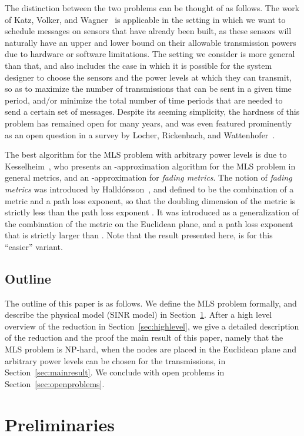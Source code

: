 \documentclass{article}
\begin{document}
The distinction between the two problems can be thought of as follows. The work of Katz, Volker, and Wagner~\cite{KVW10}
is applicable in the setting in which we want to schedule messages on sensors that have already been built, as these sensors will naturally have an upper and lower bound on their allowable transmission powers due to hardware or software limitations.
The setting we consider is more general than that, and also includes the case in which
it is possible for the system designer to choose the sensors and the power levels at which they can transmit, so as to maximize the number of transmissions that can be sent in a given time period, and/or minimize the total number of time periods that are needed to send a certain set of messages.  Despite its seeming simplicity, the hardness of this problem has remained open for many years, and was even featured prominently as an open question in a survey by Locher, Rickenbach, and Wattenhofer~\cite{LRW08}.


The best algorithm for the MLS problem with arbitrary power levels is due to Kesselheim~\cite{K11}, who presents an -approximation algorithm for the MLS problem in general metrics, and an -approximation for {\em fading metrics}. The notion of {\em fading metrics} was introduced by Halld\'orsson~\cite{H09}, and defined to be the combination of a metric and a path loss exponent, so that the doubling dimension of the metric is strictly less than the path loss exponent . It was introduced as a generalization of the combination of the metric on the Euclidean plane, and a path loss exponent  that is strictly larger than . Note that the result presented here, is for this ``easier'' variant.


\subsection{Outline}
The outline of this paper is as follows. We define the MLS problem formally, and describe the physical model (SINR model) in Section~\ref{sec:pre}. After a high level overview of the reduction in Section~\ref{sec:highlevel}, we give a detailed description of the reduction and the proof the main result of this paper, namely that the MLS problem is NP-hard, when the nodes are placed in the Euclidean plane and arbitrary power levels can be chosen for the transmissions, in Section~\ref{sec:mainresult}. We conclude with open problems in Section~\ref{sec:openproblems}.


\section{Preliminaries}
\label{sec:pre}
\end{document}
